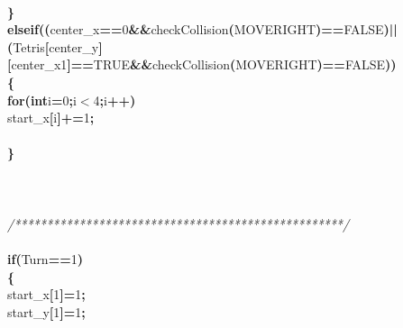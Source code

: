 \documentclass[a4paper, 10pt]{article}
\newcommand\SPC{\hspace*{0.6em}}
\newcommand\HYP{\mbox{\char 45}}
\newcommand{\CppAComment}[1]{\textit{\textcolor[rgb]{0.2,0.6,1}{#1}}}
\newcommand{\CppAIdentifier}[1]{#1}
\newcommand{\CppANumber}[1]{\textcolor[rgb]{0.5,0,0.5}{#1}}
\newcommand{\CppAReservedWord}[1]{\textbf{#1}}
\newcommand{\CppASpace}[1]{\colorbox[rgb]{1,1,1}{#1}}
\newcommand{\CppASymbol}[1]{\textbf{\textcolor[rgb]{1,0,0}{#1}}}
\begin{document}
\begin{ttfamily}
\\
\CppASpace{\SPC \SPC \SPC \SPC }\CppASymbol{\}}\\
\CppASpace{\SPC \SPC \SPC \SPC }\CppAReservedWord{else}\CppASpace{\SPC }\CppAReservedWord{if}\CppASymbol{(}\CppASymbol{(}\CppAIdentifier{center\_x}\CppASymbol{==}\CppANumber{0}\CppASpace{\SPC }\CppASymbol{\&\&}\CppASpace{\SPC }\CppAIdentifier{checkCollision}\CppASymbol{(}\CppAIdentifier{MOVERIGHT}\CppASymbol{)}\CppASymbol{==}\CppAIdentifier{FALSE}\CppASymbol{)}\CppASpace{\SPC }\CppASymbol{||}\CppASpace{\SPC }\CppASymbol{(}\CppAIdentifier{Tetris}\CppASymbol{[}\CppAIdentifier{center\_y}\CppASymbol{]}\CppASymbol{[}\CppAIdentifier{center\_x}\CppASymbol{\HYP }\CppANumber{1}\CppASymbol{]}\CppASymbol{==}\CppAIdentifier{TRUE}\CppASymbol{\&\&}\CppAIdentifier{checkCollision}\CppASymbol{(}\CppAIdentifier{MOVERIGHT}\CppASymbol{)}\CppASymbol{==}\CppAIdentifier{FALSE}\CppASymbol{)}\CppASymbol{)}\\
\CppASpace{\SPC \SPC \SPC \SPC }\CppASymbol{\{}\\
\CppASpace{\SPC \SPC \SPC \SPC \SPC }\CppAReservedWord{for}\CppASymbol{(}\CppAReservedWord{int}\CppASpace{\SPC }\CppAIdentifier{i}\CppASymbol{=}\CppANumber{0}\CppASymbol{;}\CppAIdentifier{i}\CppASymbol{$<$}\CppANumber{4}\CppASymbol{;}\CppAIdentifier{i}\CppASymbol{++}\CppASymbol{)}\\
\CppASpace{\SPC \SPC \SPC \SPC \SPC \SPC }\CppAIdentifier{start\_x}\CppASymbol{[}\CppAIdentifier{i}\CppASymbol{]}\CppASymbol{+=}\CppANumber{1}\CppASymbol{;}\\
\\
\CppASpace{\SPC \SPC \SPC \SPC }\CppASymbol{\}}\\
\\
\\
\\
\CppASpace{\SPC \SPC \SPC }\CppAComment{/***************************************************/}\\
\\
\CppASpace{\SPC \SPC \SPC \SPC }\CppAReservedWord{if}\CppASymbol{(}\CppAIdentifier{Turn}\CppASymbol{==}\CppANumber{1}\CppASymbol{)}\\
\CppASpace{\SPC \SPC \SPC \SPC }\CppASymbol{\{}\\
\CppASpace{\SPC \SPC \SPC \SPC \SPC }\CppAIdentifier{start\_x}\CppASymbol{[}\CppANumber{1}\CppASymbol{]}\CppASymbol{\HYP =}\CppANumber{1}\CppASymbol{;}\\
\CppASpace{\SPC \SPC \SPC \SPC \SPC }\CppAIdentifier{start\_y}\CppASymbol{[}\CppANumber{1}\CppASymbol{]}\CppASymbol{\HYP =}\CppANumber{1}\CppASymbol{;}\\

\end{ttfamily}
\end{document}
